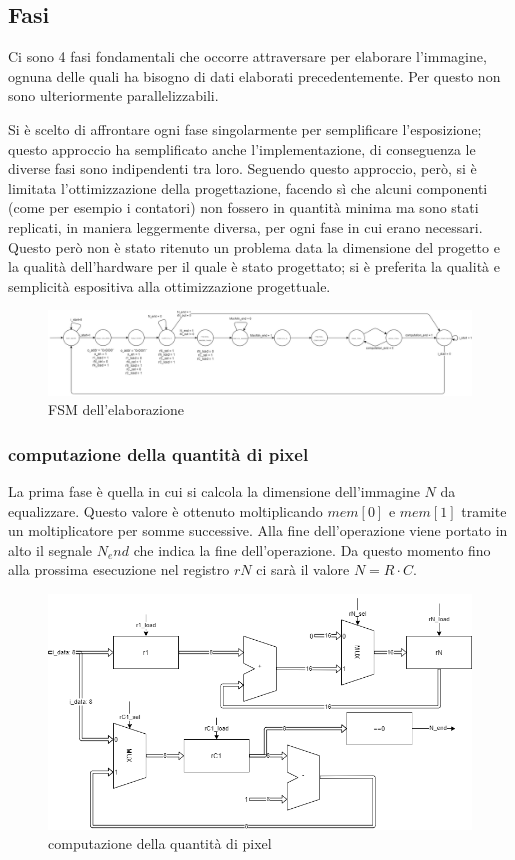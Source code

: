 \documentclass[11pt]{article} %
\begin{document}
\subsection{Fasi}
Ci sono 4 fasi fondamentali che occorre attraversare per elaborare l'immagine, ognuna delle quali ha bisogno di dati elaborati precedentemente. Per questo non sono ulteriormente parallelizzabili.

Si è scelto di affrontare ogni fase singolarmente per semplificare l'esposizione; questo approccio ha semplificato anche l'implementazione, di conseguenza le diverse fasi sono indipendenti tra loro. Seguendo questo approccio, però, si è limitata l'ottimizzazione della progettazione, facendo sì che alcuni componenti (come per esempio i contatori) non fossero in quantità minima ma sono stati replicati, in maniera leggermente diversa, per ogni fase in cui erano necessari. Questo però non è stato ritenuto un problema data la dimensione del progetto e la qualità dell'hardware per il quale è stato progettato; si è preferita la qualità e semplicità espositiva alla ottimizzazione progettuale.

\begin{figure}[ht!]
\centering
\includegraphics[width=150mm]{datapaths/FSM.png}
\caption{FSM dell'elaborazione}
\end{figure}

\subsubsection{computazione della quantità di pixel}
La prima fase è quella in cui si calcola la dimensione dell'immagine $N$ da equalizzare. Questo valore è ottenuto moltiplicando $mem[0]$ e $mem[1]$ tramite un moltiplicatore per somme successive. Alla fine dell'operazione viene portato in alto il segnale $N_end$ che indica la fine dell'operazione. Da questo momento fino alla prossima esecuzione nel registro $rN$ ci sarà il valore $N = R \cdot C$.

\begin{figure}[ht!]
\centering
\includegraphics[width=120mm]{datapaths/regN.png}
\caption{computazione della quantità di pixel}
\end{figure}
\end{document}
